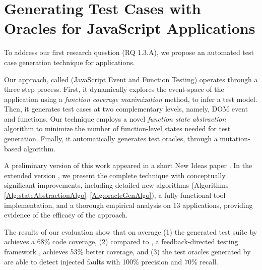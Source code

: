 \chapter{Generating Test Cases with Oracles for JavaScript Applications} \label{Chap:jseft} 
To address our first research question (RQ 1.3.A), we propose an automated test case  generation technique for \javascript applications. 

Our approach, called \jseft (JavaScript Event and Function Testing) operates through a three step process. 
First, it dynamically explores the event-space of the application using a \emph{function coverage maximization} method, to infer a test model. Then, it generates test cases at two complementary levels, namely, DOM event and \javascript functions. Our technique employs a novel \emph{function state abstraction} algorithm to minimize the number of function-level states needed for test generation.
Finally,  it automatically generates test oracles, through a mutation-based algorithm.

A preliminary version of this work appeared in a short New Ideas paper \cite{shabnam:ase13}. In the extended version \cite{mirshokraie:icst15}, we present the complete technique with conceptually significant improvements, including detailed new algorithms (Algorithms \ref{Alg:stateAbstractionAlgo}--\ref{Alg:oracleGenAlgo}), a fully-functional tool implementation, and a thorough empirical analysis on 13 \javascript applications, providing evidence of the efficacy of the approach.

%
%
The results of our evaluation show that on average (1) the generated test suite by \jseft achieves a 68\% \javascript code coverage, 
(2) compared to \artemis, a feedback-directed \javascript testing framework \cite{artzi:icse11}, \jseft achieves 53\% better coverage, and (3) the test oracles generated by \jseft are able to detect injected faults with 100\% precision and 70\% recall.

%
%




 




